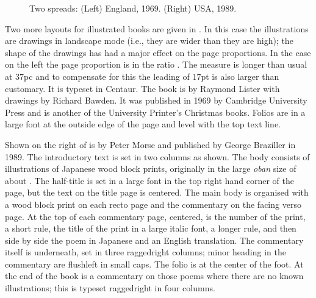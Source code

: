 \documentclass[10pt,a4paper,oneside,extrafontsizes]{memoir}%
\begin{document}
\begin{figure}
\centering
\begin{minipage}[b]{\pwlayi}
\end{minipage}
\hfill
\begin{minipage}[b]{\pwlayi}
\end{minipage}
\caption[Two spreads: England, 1969 and USA 1989]%
        {Two spreads: (Left) England, 1969.
         (Right) USA, 1989.} \label{fb:16}
\end{figure}

\begin{paracol}{2}
\switchEng
    Two more layouts for illustrated books are given in .
In this case the illustrations are drawings in landscape 
mode (i.e., they are wider than they are high); the shape of the drawings 
has had a major effect on the page proportions. In the case on the left 
the page proportion is in the ratio . The measure is 
longer than usual at $37$pc and to compensate for this the leading of $17$pt 
is also larger than customary. It is typeset in Centaur.
The book is
 by Raymond Lister with drawings by Richard Bawden.
It was published in 1969 by Cambridge University 
Press and is another of
the University Printer's Christmas books. Folios
are in a large font at the outside edge of the page and level with the 
top text line.


Shown on the right of  is 
by Peter Morse and published by George Braziller in 1989. The introductory
text is set in two columns as shown. The body consists 
of illustrations of Japanese wood block prints, 
originally in the large \textit{oban} size of about .
The half-title 
is set in a large font in the top
right hand corner of the page, but the text on the title
page is centered. The main body is organised with a wood block print
on each recto page and the commentary on the facing verso page. At the
top of each commentary page, centered, is the number of the print, a short
rule, the title of the print in a large italic font, a longer rule,
and then side by side the poem in Japanese and an English translation.
The commentary itself is underneath, set in three raggedright 
columns; minor heading in the commentary are
flushleft in small caps. The folio is at the center
of the foot. At the end of the book is a commentary on
those poems where there are no known illustrations; this is typeset
raggedright in four columns.
\end{paracol}
\end{document}
